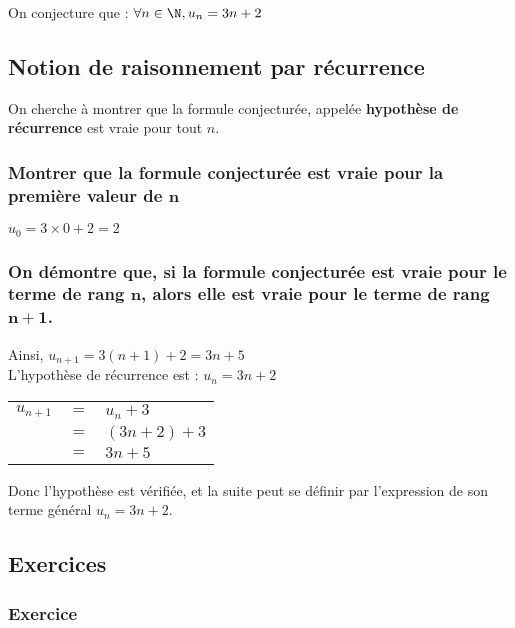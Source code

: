 \vspace*{.3cm}

On conjecture que : $\forall n \in \N, u_n = 3n + 2$

\subsection{Notion de raisonnement par récurrence}

On cherche à montrer que la formule conjecturée, appelée \textbf{hypothèse de récurrence} est vraie pour tout $n$.

\subsubsection{Montrer que la formule conjecturée est vraie pour la première valeur de $\mathbf{n}$}

$u_0 = 3 \times 0 + 2 = 2$ 

\subsubsection{On démontre que, si la formule conjecturée est vraie pour le terme de rang $\mathbf{n}$, alors elle est vraie pour le terme de rang $\mathbf{n + 1}$.}

Ainsi, $u_{n+1} = 3\left(n+1\right) + 2 = 3n + 5$ \\

L'hypothèse de récurrence est : $u_n = 3n + 2$ \\

\begin{tabular}{lll}
$u_{n+1}$ & $=$ & $u_n + 3$ \\
& $=$ & $\left(3n + 2\right) + 3$ \\
& $=$ & $3n + 5$ \\ 
\end{tabular}

\vspace*{.3cm}

Donc l'hypothèse est vérifiée, et la suite peut se définir par l'expression de son terme général $u_n = 3n + 2$.

\newpage

\vspace*{-2cm}

\subsection{Exercices}

\subsubsection{Exercice }

